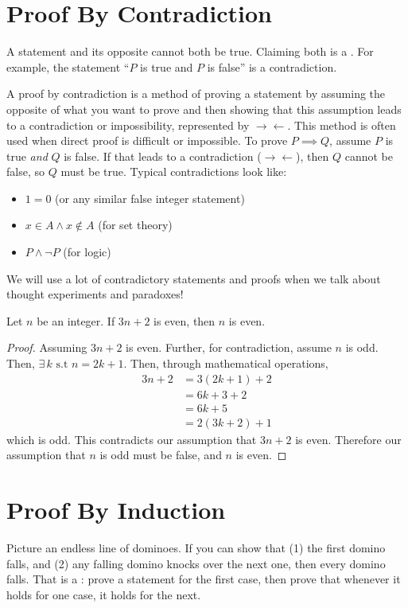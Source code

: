 \section{Proof By Contradiction}
A statement and its opposite cannot both be true. Claiming both is a . For example, the statement ``$P$ is true and $P$ is false'' is a contradiction.

A proof by contradiction is a method of proving a statement by assuming the opposite of what you want to prove and then showing that this assumption leads to a contradiction or impossibility, represented by $\rightarrow \leftarrow$. This method is often used when direct proof is difficult or impossible. To prove $P \implies Q$, assume $P$ is true \emph{and} $Q$ is false. If that leads to a contradiction ($\rightarrow \leftarrow$), then $Q$ cannot be false, so $Q$ must be true. Typical contradictions look like:
\begin{itemize}
    \item $1 = 0$ (or any similar false integer statement)
    \item $x \in A \wedge x \notin A$ (for set theory)
    \item $P \wedge \neg P$ (for logic)
\end{itemize}

We will use a lot of contradictory statements and proofs when we talk about thought experiments and paradoxes!
\begin{theorem}
    Let $n$ be an integer. If $3n+2$ is even, then $n$ is even.
\end{theorem}
\begin{proof}
    Assuming $3n+2$ is even. Further, for contradiction, assume $n$ is odd.
    Then, $\exists \, k \text{ s.t } n=2k+1$. Then, through mathematical operations,
    \begin{align*}
        3n + 2 & = 3(2k+1) + 2   \\
               & = 6k + 3 + 2    \\
               & = 6k + 5        \\
               & = 2(3k + 2) + 1
    \end{align*}
    which is odd. This contradicts our assumption that $3n+2$ is even. Therefore our assumption that $n$ is odd must be false, and $n$ is even.
\end{proof}


\section{Proof By Induction}
Picture an endless line of dominoes. If you can show that (1) the first domino falls, and (2) any falling domino knocks over the next one, then every domino falls. That is a : prove a statement for the first case, then prove that whenever it holds for one case, it holds for the next.

